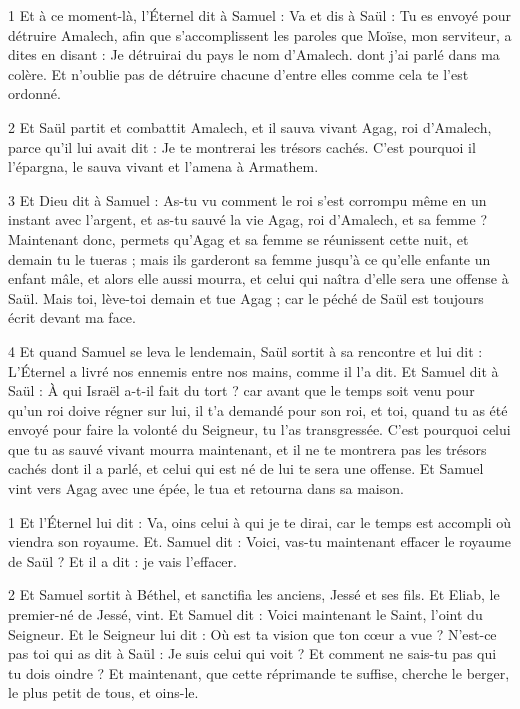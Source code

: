 
\par 1 Et à ce moment-là, l'Éternel dit à Samuel : Va et dis à Saül : Tu es envoyé pour détruire Amalech, afin que s'accomplissent les paroles que Moïse, mon serviteur, a dites en disant : Je détruirai du pays le nom d'Amalech. dont j'ai parlé dans ma colère. Et n’oublie pas de détruire chacune d’entre elles comme cela te l’est ordonné.

\par 2 Et Saül partit et combattit Amalech, et il sauva vivant Agag, roi d'Amalech, parce qu'il lui avait dit : Je te montrerai les trésors cachés. C'est pourquoi il l'épargna, le sauva vivant et l'amena à Armathem.

\par 3 Et Dieu dit à Samuel : As-tu vu comment le roi s'est corrompu même en un instant avec l'argent, et as-tu sauvé la vie Agag, roi d'Amalech, et sa femme ? Maintenant donc, permets qu'Agag et sa femme se réunissent cette nuit, et demain tu le tueras ; mais ils garderont sa femme jusqu'à ce qu'elle enfante un enfant mâle, et alors elle aussi mourra, et celui qui naîtra d'elle sera une offense à Saül. Mais toi, lève-toi demain et tue Agag ; car le péché de Saül est toujours écrit devant ma face.

\par 4 Et quand Samuel se leva le lendemain, Saül sortit à sa rencontre et lui dit : L'Éternel a livré nos ennemis entre nos mains, comme il l'a dit. Et Samuel dit à Saül : À qui Israël a-t-il fait du tort ? car avant que le temps soit venu pour qu'un roi doive régner sur lui, il t'a demandé pour son roi, et toi, quand tu as été envoyé pour faire la volonté du Seigneur, tu l'as transgressée. C'est pourquoi celui que tu as sauvé vivant mourra maintenant, et il ne te montrera pas les trésors cachés dont il a parlé, et celui qui est né de lui te sera une offense. Et Samuel vint vers Agag avec une épée, le tua et retourna dans sa maison.


\par 1 Et l'Éternel lui dit : Va, oins celui à qui je te dirai, car le temps est accompli où viendra son royaume. Et. Samuel dit : Voici, vas-tu maintenant effacer le royaume de Saül ? Et il a dit : je vais l’effacer.

\par 2 Et Samuel sortit à Béthel, et sanctifia les anciens, Jessé et ses fils. Et Eliab, le premier-né de Jessé, vint. Et Samuel dit : Voici maintenant le Saint, l'oint du Seigneur. Et le Seigneur lui dit : Où est ta vision que ton cœur a vue ? N'est-ce pas toi qui as dit à Saül : Je suis celui qui voit ? Et comment ne sais-tu pas qui tu dois oindre ? Et maintenant, que cette réprimande te suffise, cherche le berger, le plus petit de tous, et oins-le.

